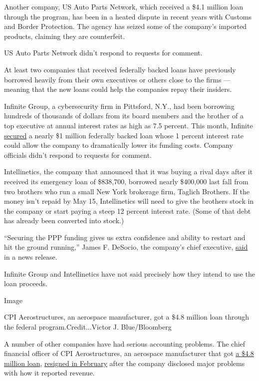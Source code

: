 Another company, US Auto Parts Network, which received a \$4.1 million
loan through the program, has been in a heated dispute in recent years
with Customs and Border Protection. The agency has seized some of the
company's imported products, claiming they are counterfeit.

US Auto Parts Network didn't respond to requests for comment.

At least two companies that received federally backed loans have
previously borrowed heavily from their own executives or others close to
the firms --- meaning that the new loans could help the companies repay
their insiders.

Infinite Group, a cybersecurity firm in Pittsford, N.Y., had been
borrowing hundreds of thousands of dollars from its board members and
the brother of a top executive at annual interest rates as high as 7.5
percent. This month, Infinite
\href{https://www.sec.gov/Archives/edgar/data/884650/000165495420004141/igiform8-kpppnotewithupst.htm}{secured}
a nearly \$1 million federally backed loan whose 1 percent interest rate
could allow the company to dramatically lower its funding costs. Company
officials didn't respond to requests for comment.

Intellinetics, the company that announced that it was buying a rival
days after it received its emergency loan of \$838,700, borrowed nearly
\$400,000 last fall from two brothers who run a small New York brokerage
firm, Taglich Brothers. If the money isn't repaid by May 15,
Intellinetics will need to give the brothers stock in the company or
start paying a steep 12 percent interest rate. (Some of that debt has
already been converted into stock.)

``Securing the PPP funding gives us extra confidence and ability to
restart and hit the ground running,'' James F. DeSocio, the company's
chief executive,
\href{https://www.sec.gov/Archives/edgar/data/1081745/000149315220006705/ex99-1.htm}{said}
in a news release.

Infinite Group and Intellinetics have not said precisely how they intend
to use the loan proceeds.

Image

CPI Aerostructures, an aerospace manufacturer, got a \$4.8 million loan
through the federal program.Credit...Victor J. Blue/Bloomberg

A number of other companies have had serious accounting problems. The
chief financial officer of CPI Aerostructures, an aerospace manufacturer
that got
\href{http://www.cpiaero.com/cpi-aero-secures-\%244.8m-loan.html}{a
\$4.8 million loan},
\href{https://www.newsday.com/business/cpi-aerostructures-financial-reports-1.41833254}{resigned
in February} after the company disclosed major problems with how it
reported revenue.


